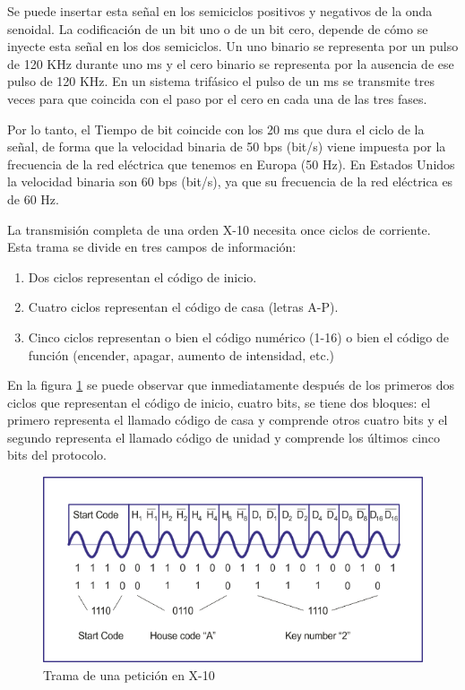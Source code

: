 Se puede insertar esta señal en los semiciclos positivos y negativos de la onda senoidal. La codificación de un bit uno o de un bit cero, depende de cómo se inyecte esta señal en los dos semiciclos. Un uno binario se representa por un pulso de 120 KHz durante uno ms y el cero binario se representa por la ausencia de ese pulso de 120 KHz. En un sistema trif\'asico el pulso de un ms se transmite tres veces para que coincida con el paso por el cero en cada una de las tres fases.


Por lo tanto, el Tiempo de bit coincide con los 20 ms que dura el ciclo de la señal, de forma que la velocidad binaria de 50 bps (bit/s) viene impuesta por la frecuencia de la red eléctrica que tenemos en Europa (50 Hz). En Estados Unidos la velocidad binaria son 60 bps (bit/s), ya que su frecuencia de la red eléctrica es de 60 Hz.


La transmisión completa de una orden X-10 necesita once ciclos de corriente. Esta trama se divide en tres campos de información:
\begin{enumerate}
	\item Dos ciclos representan el código de inicio.
	\item Cuatro ciclos representan el código de casa (letras A-P).
	\item Cinco ciclos representan o bien el código numérico (1-16) o bien el código de función (encender, apagar, aumento de intensidad, etc.)
\end{enumerate}


En la figura \ref{fig:trama_x10} se puede observar que inmediatamente después de los primeros dos ciclos que representan el código de inicio, cuatro bits, se tiene dos bloques: el primero representa el llamado código de casa y comprende otros cuatro bits y el segundo representa el llamado código de unidad y comprende los últimos cinco bits del protocolo.

\begin{figure}[htbp]
	\centering
		\includegraphics{imagenes/trama_x10.png}
	\caption{Trama de una petición en X-10}
	\label{fig:trama_x10}
\end{figure}


